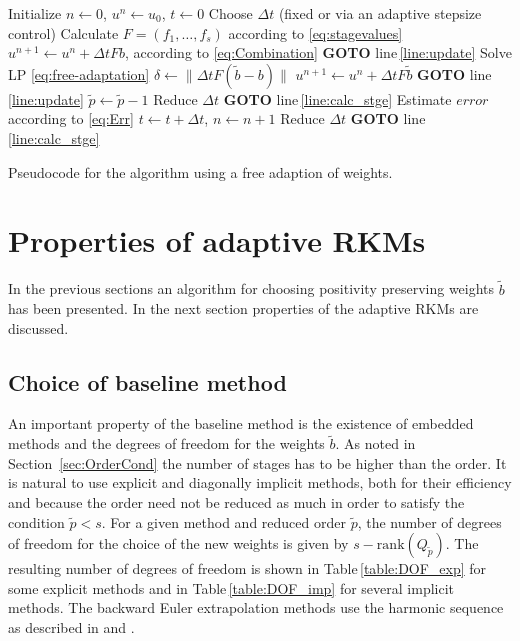 \documentclass[a4paper]{article}
\numberwithin{equation}{section}
\theoremstyle{plain}
\theoremstyle{definition}
\numberwithin{theorem}{section}
\newcommand{\dt}{{\Delta t}}
\newcommand{\1}{\mathbbm{1}}
\newcommand{\bt}{\tilde{b}}
\newcommand{\pt}{{\tilde{p}}}
\begin{document}
\begin{algorithm}[ht]
\begin{algorithmic}[1]
\State Initialize $n \leftarrow 0$, $u^n \leftarrow u_0$, $t \leftarrow 0$
\State Choose $\Delta t$ (fixed or via an adaptive stepsize control)
\State Calculate $F = (f_1, \dots, f_s)$ according to \eqref{eq:stagevalues} \label{line:calc_stge}
\State $u^{n+1} \leftarrow u^n + \Delta t Fb$, according to \eqref{eq:Combination}
	\State  \textbf{GOTO} line\,\ref{line:update}
\Else
	\State{$\pt \leftarrow p_{start}$}
	\While{$\pt \geq p_{min}$}
		\State Solve LP \eqref{eq:free-adaptation}
			\State $\delta \leftarrow \| \Delta t F(\bt-b)\|$
				\State $u^{n+1} \leftarrow u^n+\Delta t F \tilde b$
				\State  \textbf{GOTO} line\,\ref{line:update}
			\EndIf
		\EndIf
		\State $\pt \leftarrow \pt - 1$
	\EndWhile
	\State Reduce $\dt$
	\State \textbf{GOTO} line\,\ref{line:calc_stge}
\EndIf
\State Estimate $error$ according to \eqref{eq:Err} \label{line:update}
	\State $t \leftarrow t + \dt$, $n \leftarrow n+1$
\Else
	\State Reduce $\dt$
	\State \textbf{GOTO} line\,\ref{line:calc_stge}
\EndIf
\EndWhile
\end{algorithmic}
\caption{Pseudocode for the algorithm using a free adaption of weights.}
\label{alg:Adaption}
\end{algorithm}



\section{Properties of adaptive RKMs}

In the previous sections an algorithm for choosing positivity preserving weights $\bt$ has been presented.
In the next section properties of the adaptive RKMs are discussed.

\subsection{Choice of baseline method} \label{sec:integration}
An important property of the baseline method is the existence of embedded methods and the degrees of freedom for the weights $\bt$.
As noted in Section~\ref{sec:OrderCond} the number of stages has to be higher than the order.
It is natural to use explicit and diagonally implicit methods, both for their efficiency and because
the order need not be reduced as much in order to satisfy the condition $\pt<s$.
For a given method and reduced order $\pt$, the number of degrees of freedom for the choice of the new weights
is given by $s-\mathrm{rank}(Q_{\pt})$. %
The resulting number of degrees of freedom is shown in Table\,\ref{table:DOF_exp}
for some explicit methods and in Table\,\ref{table:DOF_imp} for several implicit
methods. The backward Euler extrapolation methods use the harmonic sequence
as described in \cite[Section~II.9]{hairer_solving_1993} and
\cite[Section~IV.9]{hairer_solving_1996}.
\end{document}
